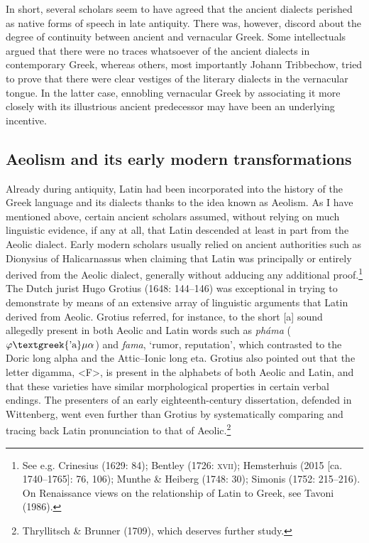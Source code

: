\begin{styleStandard}
In short, several scholars seem to have agreed that the ancient dialects perished as native forms of speech in late antiquity. There was, however, discord about the degree of continuity between ancient and vernacular Greek. Some intellectuals argued that there were no traces whatsoever of the ancient dialects in contemporary Greek, whereas others, most importantly Johann Tribbechow, tried to prove that there were clear vestiges of the literary dialects in the vernacular tongue. In the latter case, ennobling vernacular Greek by associating it more closely with its illustrious ancient predecessor may have been an underlying incentive.
\end{styleStandard}

\subsection{Aeolism and its early modern transformations}
\hypertarget{Toc19704840}{}\begin{styleStandard}
Already during antiquity, Latin had been incorporated into the history of the Greek language and its dialects thanks to the idea known as Aeolism. As I have mentioned above, certain ancient scholars assumed, without relying on much linguistic evidence, if any at all, that Latin descended at least in part from the Aeolic dialect. Early modern scholars usually relied on ancient authorities such as Dionysius of Halicarnassus when claiming that Latin was principally or entirely derived from the Aeolic dialect, generally without adducing any additional proof.\footnote{ See e.g. Crinesius (1629: 84); Bentley (1726: \textsc{xvii}); Hemsterhuis (2015 [ca. 1740–1765]: 76, 106); Munthe \& Heiberg (1748: 30); Simonis (1752: 215–216). On Renaissance views on the relationship of Latin to Greek, see Tavoni (1986).} The Dutch jurist Hugo Grotius (1648: 144–146) was exceptional in trying to demonstrate by means of an extensive array of linguistic arguments that Latin derived from Aeolic. Grotius referred, for instance, to the short [a] sound allegedly present in both Aeolic and Latin words such as \textit{pháma }($\varphi \text{\textgreek{'a}}\mu \alpha $) and \textit{fama}, ‘rumor, reputation’, which contrasted to the Doric long alpha and the Attic–Ionic long eta. Grotius also pointed out that the letter digamma, {\textless}F{\textgreater}, is present in the alphabets of both Aeolic and Latin, and that these varieties have similar morphological properties in certain verbal endings. The presenters of an early eighteenth-century dissertation, defended in Wittenberg, went even further than Grotius by systematically comparing and tracing back Latin pronunciation to that of Aeolic.\footnote{ Thryllitsch \& Brunner (1709), which deserves further study.}
\end{styleStandard}

